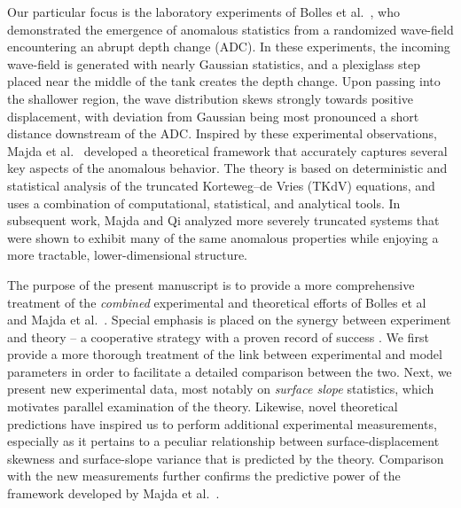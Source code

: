 \documentclass[11pt]{article}
\begin{document}
Our particular focus is the laboratory experiments of Bolles et al.~\cite{bolles2019}, who demonstrated the emergence of anomalous statistics from a randomized wave-field encountering an abrupt depth change (ADC). In these experiments, the incoming wave-field is generated with nearly Gaussian statistics, and a plexiglass step placed near the middle of the tank creates the depth change. Upon passing into the shallower region, the wave distribution skews strongly towards positive displacement, with deviation from Gaussian being most pronounced a short distance downstream of the ADC. Inspired by these experimental observations, Majda et al.~\cite{majda2019} developed a theoretical framework that accurately captures several key aspects of the anomalous behavior. The theory is based on deterministic and statistical analysis of the truncated Korteweg–de Vries (TKdV) equations, and uses a combination of computational, statistical, and analytical tools. In subsequent work, Majda and Qi \cite{majdaqi2019} analyzed more severely truncated systems that were shown to exhibit many of the same anomalous properties while enjoying a more tractable, lower-dimensional structure.

The purpose of the present manuscript is to provide a more comprehensive treatment of the {\em combined} experimental and theoretical efforts of Bolles et al~\cite{bolles2019} and Majda et al.~\cite{majda2019, majdaqi2019}. Special emphasis is placed on the synergy between experiment and theory -- a cooperative strategy with a proven record of success \cite{camassa2012stratified, ristroph2012, ganedi2018equilibrium}. 
We first provide a more thorough treatment of the link between experimental and model parameters in order to facilitate a detailed comparison between the two. Next, we present new experimental data, most notably on {\em surface slope} statistics, which motivates parallel examination of the theory.  Likewise, novel theoretical predictions have inspired us to perform additional experimental measurements, especially as it pertains to a peculiar relationship between surface-displacement skewness and surface-slope variance that is predicted by the theory. Comparison with the new measurements further confirms the predictive power of the framework developed by Majda et al.~\cite{majda2019}. 
\end{document}
